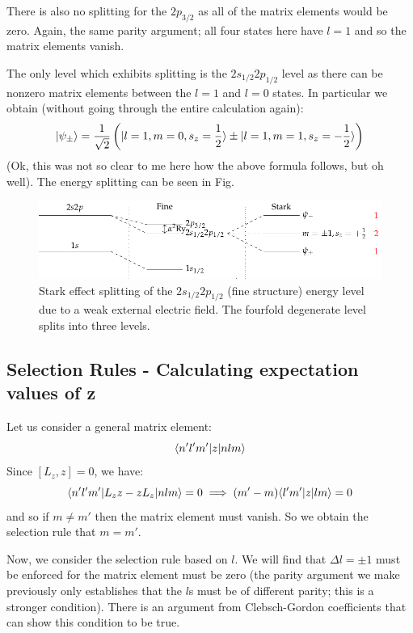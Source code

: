 There is also no splitting for the $2p_{3/2}$ as all of the matrix elements would be zero. Again, the same parity argument; all four states here have $l = 1$ and so the matrix elements vanish.

The only level which exhibits splitting is the $2s_{1/2}2p_{1/2}$ level as there can be nonzero matrix elements between the $l = 1$ and $l = 0$ states. In particular we obtain (without going through the entire calculation again):
\begin{equation}
    \lvert \psi_\pm \rangle = \frac{1}{\sqrt{2}}\left(\lvert l=1, m=0, s_z = \frac{1}{2} \rangle \pm \lvert l=1, m=1, s_z = -\frac{1}{2} \rangle\right)
\end{equation}
(Ok, this was not so clear to me here how the above formula follows, but oh well). The energy splitting can be seen in Fig.

\begin{figure}[htbp]
    \centering
    \includegraphics[]{Images/fig-weakstarkeffectsplit.pdf}
    
    \caption{Stark effect splitting of the $2s_{1/2}2p_{1/2}$ (fine structure) energy level due to a weak external electric field. The fourfold degenerate level splits into three levels.}
    \label{fig-weakstarkeffectsplit}
\end{figure}

\subsection{Selection Rules - Calculating expectation values of z}
Let us consider a general matrix element:
\begin{equation}
    \langle n'l'm' \rvert z\lvert nlm \rangle
\end{equation}
Since $[L_z, z] = 0$, we have:
\begin{equation}
    \langle n'l'm' \rvert L_z z - zL_z\lvert nlm \rangle = 0 \implies (m' - m)\langle l'm' \rvert z\lvert lm \rangle = 0
\end{equation}
and so if $m \neq m'$ then the matrix element must vanish. So we obtain the selection rule that $m = m'$. 

Now, we consider the selection rule based on $l$. We will find that $\Delta l = \pm 1$ must be enforced for the matrix element must be zero (the parity argument we make previously only establishes that the $l$s must be of different parity; this is a stronger condition). There is an argument from Clebsch-Gordon coefficients that can show this condition to be true.

